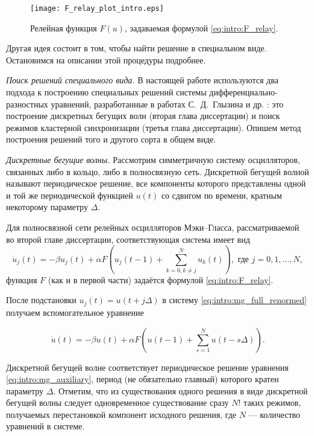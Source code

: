 \begin{figure}[ht]
	\centering
	\texttt{[image: F\_relay\_plot\_intro.eps]}
	\caption{Релейная функция $F(u)$, задаваемая формулой \eqref{eq:intro:F_relay}.}
	\label{fig:F_relay_plot:intro}
\end{figure}

Другая идея состоит в том, чтобы найти решение в специальном виде. Остановимся на описании этой процедуры подробнее.

\textit{Поиск решений специального вида.} В настоящей работе используются два подхода к построению специальных решений системы дифференциально-разностных уравнений, разработанные в работах С.~Д.~Глызина и др. \cite{GlyKol2013, GlyKol2013a, Glyzin2014}: это построение дискретных бегущих волн (вторая глава диссертации) и поиск режимов кластерной синхронизации (третья глава диссертации). Опишем метод построения решений того и другого сорта в общем виде.

\textit{Дискретные бегущие волны.} Рассмотрим симметричную систему осцилляторов, связанных либо в кольцо, либо в полносвязную сеть. Дискретной бегущей волной называют периодическое решение, все компоненты которого представлены одной и той же периодической функцией $u(t)$ со сдвигом по времени, кратным некоторому параметру $\Delta$.

Для полносвязной сети релейных осцилляторов Мэки--Гласса, рассматриваемой во второй главе диссертации, соответствующая система имеет вид
%
\begin{equation}
	\label{eq:intro:mg_full_renormed}
	\dot{u}_j(t) = -\beta u_j(t) + \alpha F \left(u_j(t - 1) + \sum\limits_{k = 0, k\neq j}^N u_k(t)\right), \text{ где } j = 0, 1, \dots, N,
\end{equation}
функция $F$ (как и в первой части) задаётся формулой \eqref{eq:intro:F_relay}.

После подстановки $u_j(t) = u(t + j\Delta)$ в систему \eqref{eq:intro:mg_full_renormed} получаем вспомогательное уравнение

\begin{equation}
	\label{eq:intro:mg_auxiliary}
	\dot{u}(t) =-\beta u(t) + \alpha F\left(u(t - 1) + \sum_{s=1}^{N}u(t-s\Delta)\right).
\end{equation}

Дискретной бегущей волне соответствует периодическое решение уравнения \eqref{eq:intro:mg_auxiliary}, период (не обязательно главный) которого кратен параметру $\Delta$. Отметим, что из существования одного решения в виде дискретной бегущей волны следует одновременное существование сразу $N!$ таких режимов, получаемых перестановкой компонент исходного решения, где $N$ --- количество уравнений в системе.

